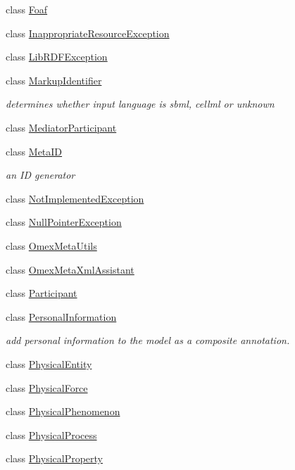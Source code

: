 \begin{DoxyCompactItemize}
class \hyperlink{classomexmeta_1_1Foaf}{Foaf}
\item 
class \hyperlink{classomexmeta_1_1InappropriateResourceException}{Inappropriate\+Resource\+Exception}
\item 
class \hyperlink{classomexmeta_1_1LibRDFException}{Lib\+R\+D\+F\+Exception}
\item 
class \hyperlink{classomexmeta_1_1MarkupIdentifier}{Markup\+Identifier}
\begin{DoxyCompactList}\small\item\em determines whether input language is sbml, cellml or unknown \end{DoxyCompactList}\item 
class \hyperlink{classomexmeta_1_1MediatorParticipant}{Mediator\+Participant}
\item 
class \hyperlink{classomexmeta_1_1MetaID}{Meta\+ID}
\begin{DoxyCompactList}\small\item\em an ID generator \end{DoxyCompactList}\item 
class \hyperlink{classomexmeta_1_1NotImplementedException}{Not\+Implemented\+Exception}
\item 
class \hyperlink{classomexmeta_1_1NullPointerException}{Null\+Pointer\+Exception}
\item 
class \hyperlink{classomexmeta_1_1OmexMetaUtils}{Omex\+Meta\+Utils}
\item 
class \hyperlink{classomexmeta_1_1OmexMetaXmlAssistant}{Omex\+Meta\+Xml\+Assistant}
\item 
class \hyperlink{classomexmeta_1_1Participant}{Participant}
\item 
class \hyperlink{classomexmeta_1_1PersonalInformation}{Personal\+Information}
\begin{DoxyCompactList}\small\item\em add personal information to the model as a composite annotation. \end{DoxyCompactList}\item 
class \hyperlink{classomexmeta_1_1PhysicalEntity}{Physical\+Entity}
\item 
class \hyperlink{classomexmeta_1_1PhysicalForce}{Physical\+Force}
\item 
class \hyperlink{classomexmeta_1_1PhysicalPhenomenon}{Physical\+Phenomenon}
\item 
class \hyperlink{classomexmeta_1_1PhysicalProcess}{Physical\+Process}
\item 
class \hyperlink{classomexmeta_1_1PhysicalProperty}{Physical\+Property}

\end{DoxyCompactItemize}
